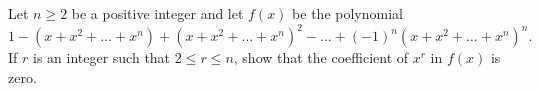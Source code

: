 Let $n \ge 2$ be a positive integer and let $f(x)$ be the polynomial
$$ 1 - (x + x^2 + \dots + x^n) + (x + x^2 + \dots + x^n)^2 - \dots + (-1)^n (x + x^2 + \dots + x^n)^n. $$
If $r$ is an integer such that $2 \le r \le n$, show that the coefficient of
$x^r$ in $f(x)$ is zero.
